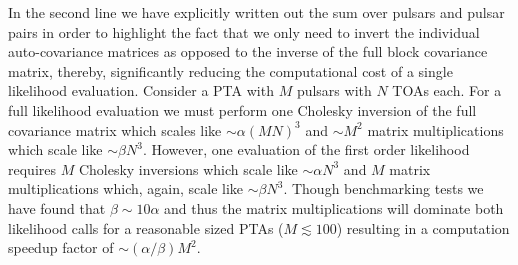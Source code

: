 \documentclass[iop]{emulateapj}
\begin{document}
In the second line we have explicitly written out the sum over pulsars and pulsar pairs in order to highlight the fact that we only need to invert the individual auto-covariance matrices as opposed to the inverse of the full block covariance matrix, thereby, significantly reducing the computational cost of a single likelihood evaluation. Consider a PTA with $M$ pulsars with $N$ TOAs each. For a full likelihood evaluation we must perform one Cholesky inversion of the full covariance matrix which scales like $\sim \alpha(MN)^{3}$ and $\sim M^{2}$ matrix multiplications which scale like $\sim\beta N^{3}$. However, one evaluation of the first order likelihood requires $M$ Cholesky inversions which scale like $\sim \alpha N^{3}$ and $M$ matrix multiplications which, again, scale like $\sim \beta N^{3}$. Though benchmarking tests we have found that $\beta\sim 10\alpha$ and thus the matrix multiplications will dominate both likelihood calls for a reasonable sized PTAs ($M\lesssim100$) resulting in a computation speedup factor of $\sim (\alpha/\beta) M^{2}$. 

\end{document}
